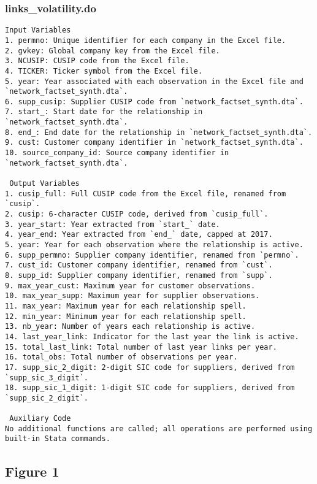 \documentclass[11pt]{article}
\theoremstyle{definition}
\newcommand{\codepath}{F:/12004835/replication_package_final/replication_package_final}
\begin{document}
	\subsubsection{links\_volatility.do}
	\begin{lstlisting}[style=Matlab]
 Input Variables
1. permno: Unique identifier for each company in the Excel file.
2. gvkey: Global company key from the Excel file.
3. NCUSIP: CUSIP code from the Excel file.
4. TICKER: Ticker symbol from the Excel file.
5. year: Year associated with each observation in the Excel file and `network_factset_synth.dta`.
6. supp_cusip: Supplier CUSIP code from `network_factset_synth.dta`.
7. start_: Start date for the relationship in `network_factset_synth.dta`.
8. end_: End date for the relationship in `network_factset_synth.dta`.
9. cust: Customer company identifier in `network_factset_synth.dta`.
10. source_company_id: Source company identifier in `network_factset_synth.dta`.

 Output Variables
1. cusip_full: Full CUSIP code from the Excel file, renamed from `cusip`.
2. cusip: 6-character CUSIP code, derived from `cusip_full`.
3. year_start: Year extracted from `start_` date.
4. year_end: Year extracted from `end_` date, capped at 2017.
5. year: Year for each observation where the relationship is active.
6. supp_permno: Supplier company identifier, renamed from `permno`.
7. cust_id: Customer company identifier, renamed from `cust`.
8. supp_id: Supplier company identifier, renamed from `supp`.
9. max_year_cust: Maximum year for customer observations.
10. max_year_supp: Maximum year for supplier observations.
11. max_year: Maximum year for each relationship spell.
12. min_year: Minimum year for each relationship spell.
13. nb_year: Number of years each relationship is active.
14. last_year_link: Indicator for the last year the link is active.
15. total_last_link: Total number of last year links per year.
16. total_obs: Total number of observations per year.
17. supp_sic_2_digit: 2-digit SIC code for suppliers, derived from `supp_sic_3_digit`.
18. supp_sic_1_digit: 1-digit SIC code for suppliers, derived from `supp_sic_2_digit`.

 Auxiliary Code
No additional functions are called; all operations are performed using built-in Stata commands.
	\end{lstlisting}
	
	
	\subsection{Figure 1}
\end{document}
